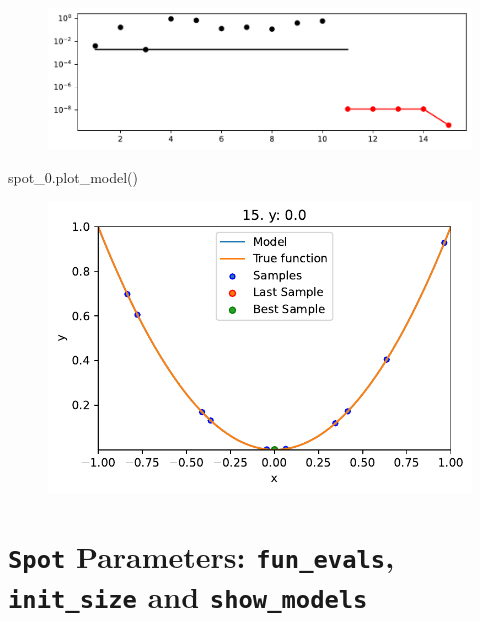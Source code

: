 \documentclass[
  letterpaper,
  DIV=11,
  numbers=noendperiod]{scrreprt}
\newenvironment{Shaded}{\begin{snugshade}}{\end{snugshade}}
\newcommand{\NormalTok}[1]{\textcolor[rgb]{0.00,0.23,0.31}{#1}}
\begin{document}
\begin{figure}[H]

{\centering \includegraphics{007_num_spot_intro_files/figure-pdf/cell-8-output-1.pdf}

}

\end{figure}

\begin{Shaded}
\begin{Highlighting}[]
\NormalTok{spot\_0.plot\_model()}
\end{Highlighting}
\end{Shaded}

\begin{figure}[H]

{\centering \includegraphics{007_num_spot_intro_files/figure-pdf/cell-9-output-1.pdf}

}

\end{figure}

\hypertarget{spot-parameters-fun_evals-init_size-and-show_models}{%
\section{\texorpdfstring{\texttt{Spot} Parameters: \texttt{fun\_evals},
\texttt{init\_size} and
\texttt{show\_models}}{Spot Parameters: fun\_evals, init\_size and show\_models}}\label{spot-parameters-fun_evals-init_size-and-show_models}}
\end{document}
